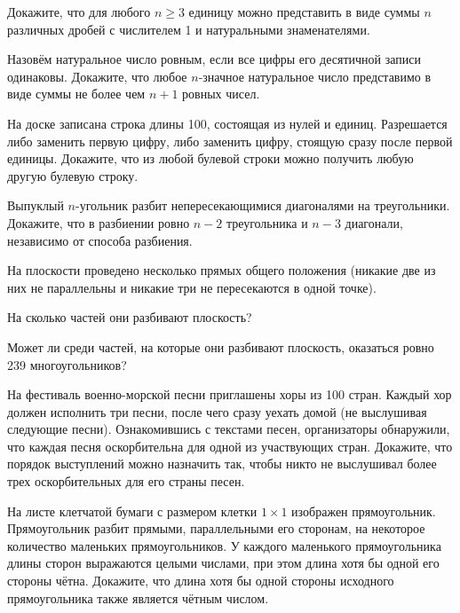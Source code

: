 \begin{problems}
\item Докажите, что для любого $n\geqslant3$ единицу можно представить в виде суммы $n$ различных дробей с числителем 1 и натуральными знаменателями.

\item Назовём натуральное число ровным, если все цифры его десятичной записи одинаковы. Докажите, что любое $n$-значное натуральное число представимо в виде суммы не более чем $n+1$ ровных чисел.

\item На доске записана строка длины 100, состоящая из нулей и единиц. Разрешается либо заменить первую цифру, либо заменить цифру, стоящую сразу после первой единицы. Докажите, что из любой булевой строки можно получить любую другую булевую строку.

\item Выпуклый $n$-угольник разбит непересекающимися диагоналями на треугольники. Докажите, что в разбиении ровно $n-2$ треугольника и $n-3$ диагонали, независимо от способа разбиения.

\item На плоскости проведено несколько прямых общего положения (никакие две из них не параллельны и никакие три не пересекаются в одной точке).
\begin{parts}
  \item На сколько частей они разбивают плоскость?
  \item Может ли среди частей, на которые они разбивают плоскость, оказаться ровно 239 многоугольников?
\end{parts}

\item На фестиваль военно-морской песни приглашены хоры из 100 стран. Каждый хор должен исполнить три песни, после чего сразу уехать домой (не выслушивая следующие песни). Ознакомившись с текстами песен, организаторы обнаружили, что каждая песня оскорбительна для одной из участвующих стран. Докажите, что порядок выступлений можно назначить так, чтобы никто не выслушивал более трех оскорбительных для его страны песен.

\item На листе клетчатой бумаги с размером клетки $1\times1$ изображен прямоугольник. Прямоугольник разбит прямыми, параллельными его сторонам, на некоторое количество маленьких прямоугольников. У каждого маленького прямоугольника длины сторон выражаются целыми числами, при этом длина хотя бы одной его стороны чётна. Докажите, что длина хотя бы одной стороны исходного прямоугольника также является чётным числом.


\end{problems}
